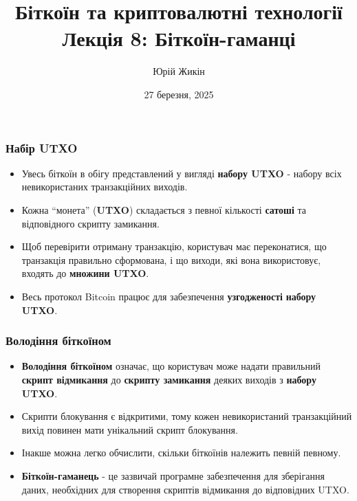 \documentclass{beamer}
\title{
  Біткоїн та криптовалютні технології \\
  Лекція 8: Біткоїн-гаманці
}
\author{Юрій Жикін}
\date{27 березня, 2025}
\begin{document}
\frame{\titlepage}

\begin{frame}
  \frametitle{Набір UTXO}
  \begin{itemize}
  \item Увесь біткоїн в обігу представлений у вигляді \textbf{набору UTXO} -
    набору всіх невикористаних транзакційних виходів.
  \item Кожна ``монета'' (\textbf{UTXO}) складається з певної кількості
    \textbf{сатоші} та відповідного скрипту замикання.
  \item Щоб перевірити отриману транзакцію, користувач має переконатися, що
    транзакція правильно сформована, і що виходи, які вона використовує, входять
    до \textbf{множини UTXO}.
  \item Весь протокол Bitcoin працює для забезпечення \textbf{узгодженості}
    \textbf{набору UTXO}.
  \end{itemize}
\end{frame}

\begin{frame}
  \frametitle{Володіння біткоїном}
  \begin{itemize}
  \item \textbf{Володіння біткоїном} означає, що користувач може надати
    правильний \textbf{скрипт відмикання} до \textbf{скрипту замикання} деяких
    виходів з \textbf{набору UTXO}.
  \item Скрипти блокування є відкритими, тому кожен невикористаний транзакційний
    вихід повинен мати унікальний скрипт блокування.
  \item Інакше можна легко обчислити, скільки біткоїнів належить певній певному.
  \item \textbf{Біткоїн-гаманець} - це зазвичай програмне забезпечення для
    зберігання даних, необхідних для створення скриптів відмикання до
    відповідних UTXO.
  \end{itemize}
\end{frame}
\end{document}
